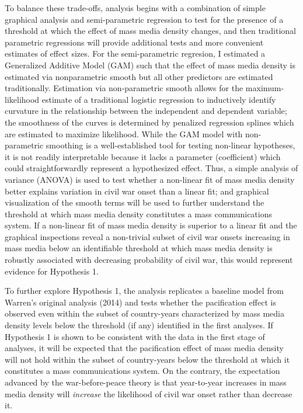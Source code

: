 \documentclass[12pt,article,oneside]{memoir}
\begin{document}
To balance these trade-offs, analysis begins with a combination of
simple graphical analysis and semi-parametric regression to test for the
presence of a threshold at which the effect of mass media density
changes, and then traditional parametric regressions will provide
additional tests and more convenient estimates of effect sizes. For the
semi-parametric regresion, I estimated a Generalized Additive Model
(GAM) such that the effect of mass media density is estimated via
nonparametric smooth but all other predictors are estimated
traditionally. Estimation via non-parametric smooth allows for the
maximum-likelihood estimate of a traditional logistic regression to
inductively identify curvature in the relationship between the
independent and dependent variable; the smoothness of the curves is
determined by penalized regression splines which are estimated to
maximize likelihood. While the GAM model with non-parametric smoothing
is a well-established tool for testing non-linear hypotheses, it is not
readily interpretable because it lacks a parameter (coefficient) which
could straightforwardly represent a hypothesized effect. Thus, a simple
analysis of variance (ANOVA) is used to test whether a non-linear fit of
mass media density better explains variation in civil war onset than a
linear fit; and graphical visualization of the smooth terms will be used
to further understand the threshold at which mass media density
constitutes a mass communications system. If a non-linear fit of mass
media density is superior to a linear fit and the graphical inspections
reveal a non-trivial subset of civil war onsets increasing in mass media
below an identifiable threshold at which mass media density is robustly
associated with decreasing probability of civil war, this would
represent evidence for Hypothesis 1.

To further explore Hypothesis 1, the analysis replicates a baseline
model from Warren's original analysis (2014) and tests whether the
pacification effect is observed even within the subset of country-years
characterized by mass media density levels below the threshold (if any)
identified in the first analyses. If Hypothesis 1 is shown to be
consistent with the data in the first stage of analyses, it will be
expected that the pacification effect of mass media density will not
hold within the subset of country-years below the threshold at which it
constitutes a mass communications system. On the contrary, the
expectation advanced by the war-before-peace theory is that year-to-year
increases in mass media density will \emph{increase} the likelihood of
civil war onset rather than decrease it.
\end{document}
